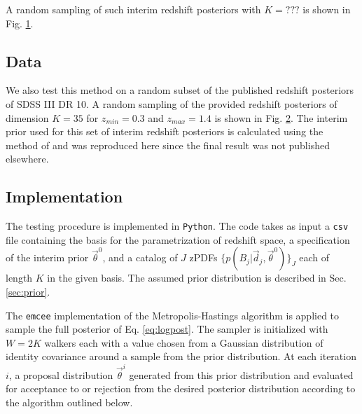 \documentclass[preprint]{aastex}
\begin{document}
A random sampling of such interim redshift posteriors with $K=???$ is shown in 
Fig. \ref{fig:nullpzs}.

\begin{figure}
\caption{}
\label{fig:nullpzs}
\end{figure}

\clearpage
\subsection{Data}
\label{sec:data}

We also test this method on a random subset of the published redshift 
posteriors of SDSS III DR 10.  A random sampling of the provided redshift 
posteriors of dimension $K=35$ for $z_{min}=0.3$ and $z_{max}=1.4$ is shown in 
Fig. \ref{fig:datapzs}.  The interim prior used for this set of interim 
redshift posteriors is calculated using the method of \citet{Sheldon2012} and 
was reproduced here since the final result was not published elsewhere.

\begin{figure}
\caption{}
\label{fig:datapzs}
\end{figure}

\clearpage
\subsection{Implementation}
\label{sec:mcmc}

The testing procedure is implemented in \texttt{Python}.  The code takes as 
input a \texttt{csv} file containing the basis for the parametrization of 
redshift space, a specification of the interim prior $\vec{\theta}^{0}$, and a 
catalog of $J$ zPDFs $\{p(B_{j}|\vec{d}_{j},\vec{\theta}^{0})\}_{J}$ each of 
length $K$ in the given basis.  The assumed prior distribution is described in 
Sec. \ref{sec:prior}.

The \texttt{emcee} implementation of the Metropolis-Hastings algorithm is 
applied to sample the full posterior of Eq. \ref{eq:logpost}.   
\citep{Foreman-Mackey2013}   The sampler is initialized with $W=2K$ walkers 
each with a value chosen from a Gaussian distribution of identity covariance 
around a sample from the prior distribution.  At each iteration $i$, a proposal 
distribution $\vec{\theta}^{i}$ generated from this prior distribution and 
evaluated for acceptance to or rejection from the desired posterior 
distribution according to the algorithm outlined below.  
\end{document}
